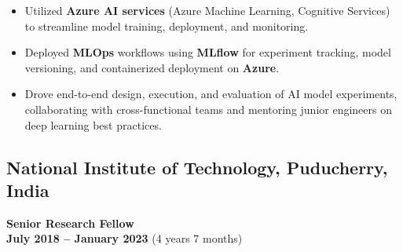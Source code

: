 \documentclass[a4paper,10pt]{article}
\begin{document}
\begin{itemize}
	\item Utilized \textbf{Azure AI services} (Azure Machine Learning, Cognitive Services) to streamline model training, deployment, and monitoring.
	\item Deployed \textbf{MLOps} workflows using \textbf{MLflow} for experiment tracking, model versioning, and containerized deployment on \textbf{Azure}.
	
	\item Drove end-to-end design, execution, and evaluation of AI model experiments, collaborating with cross-functional teams and mentoring junior engineers on deep learning best practices.
\end{itemize}

	
\subsection{National Institute of Technology, Puducherry, India}
\textbf{Senior Research Fellow} \\
\hfill \textbf{July 2018 -- January 2023} (4 years 7 months)
\end{document}
